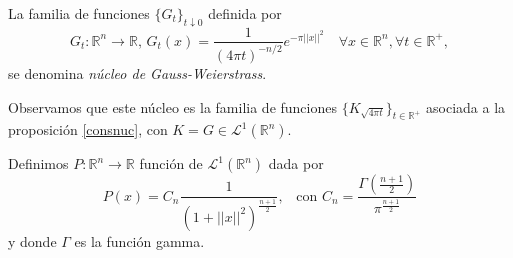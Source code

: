 \begin{ejemplo}
    La familia de funciones $\{G_t\}_{t\downarrow
0}$ definida por
    \begin{equation}
        G_{t}: \mathbb{R}^n \rightarrow \mathbb{R}, \, G_{t}(x) = \frac{1}{(4 \pi t)^{-n/2}}e^{- \pi ||x||^2} \quad \forall x \in \mathbb{R}^n, \forall t \in \mathbb{R}^+,
    \end{equation}
    se denomina \textit{núcleo de Gauss-Weierstrass}.
    
    \vspace{0.1cm}
    \noindent Observamos que este núcleo es la familia de funciones $\{K_{\sqrt{4\pi t}}\}_{t \in \mathbb{R}^+}$ asociada a la proposición \ref{consnuc}, con $K = G \in \mathscr{L}^1(\mathbb{R}^n)$.
\end{ejemplo}

\begin{definicion}\label{gauss}
    Definimos $P : \mathbb{R}^n \rightarrow \mathbb{R}$ función de $  \mathscr{L}^1(\mathbb{R}^n)$ dada por
    \begin{equation}
        P(x) =  C_n \frac{1}{(1 + ||x||^2)^{\frac{n+1}{2}}}, \; \; \; \text{con} \, \, C_n = \frac{\Gamma({\frac{n+1}{2}})}{\pi^{\frac{n+1}{2}}}
    \end{equation}
    y donde $\Gamma$ es la función gamma.
\end{definicion}

